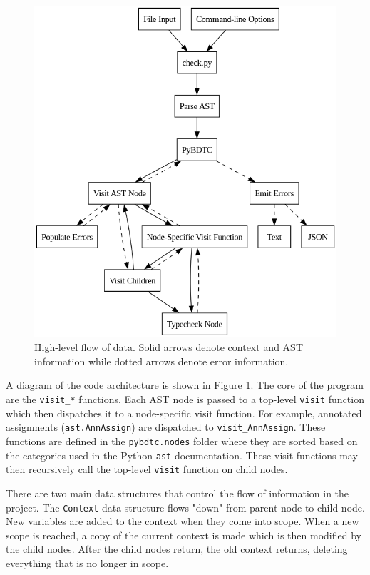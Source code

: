 \documentclass[10pt,twocolumn]{article}
\begin{document}
\begin{figure}
    \centering
    \includegraphics[width=.95\linewidth]{arch.png}
    \caption{
        High-level flow of data. Solid arrows denote context and AST information while dotted arrows denote error information.
    }
    \label{fig:architecture}
\end{figure}

A diagram of the code architecture is shown in Figure \ref{fig:architecture}. The core of the program are the \verb|visit_*| functions. Each AST node is passed to a top-level \verb|visit| function which then dispatches it to a node-specific visit function. For example, annotated assignments (\verb|ast.AnnAssign|) are dispatched to \verb|visit_AnnAssign|. These functions are defined in the \verb|pybdtc.nodes| folder where they are sorted based on the categories used in the Python \verb|ast| documentation. These visit functions may then recursively call the top-level \verb|visit| function on child nodes. 

There are two main data structures that control the flow of information in the project. The \verb|Context| data structure flows "down" from parent node to child node. New variables are added to the context when they come into scope. When a new scope is reached, a copy of the current context is made which is then modified by the child nodes. After the child nodes return, the old context returns, deleting everything that is no longer in scope. 
\end{document}
